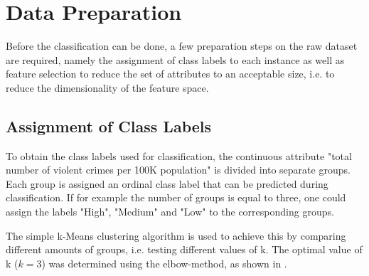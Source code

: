 \section{Data Preparation}

Before the classification can be done, a few preparation steps on the raw dataset
are required, namely the assignment of class labels to each instance as
well as feature selection to reduce the set of attributes to an
acceptable size, i.e. to reduce the dimensionality of the feature space.

\subsection{Assignment of Class Labels}
\label{sec:assignment}

To obtain the class labels used for classification, the
continuous attribute "total number of violent crimes per 100K
population" is divided into separate groups. Each group is
assigned an ordinal class label that can be predicted during classification.
If for example the number of groups is equal to three, one could
assign the labels "High", "Medium" and "Low" to the corresponding
groups.

The simple k-Means clustering algorithm is used to achieve this
by comparing different amounts of groups, i.e. testing
different values of k. The optimal value of k (\(k=3\)) was determined using the elbow-method, as shown in .

